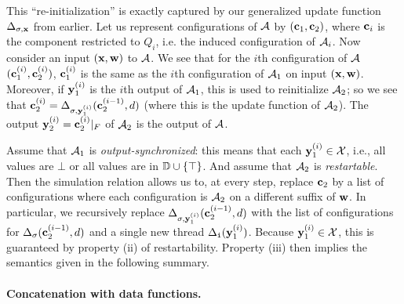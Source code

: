 This ``re-initialization'' is exactly captured by our generalized update function $\Delta_{\sigma, \textbf{x}}$ from earlier. Let us represent configurations of $\mathcal{A}$ by $(\textbf{c}_1, \textbf{c}_2)$, where $\textbf{c}_i$ is the component restricted to $Q_i$, i.e. the induced configuration of $\mathcal{A}_i$.
Now consider an input $(\textbf{x},\textbf{w})$ to $\mathcal{A}$.
We see that for the $i$th configuration of $\mathcal{A}$ $(\textbf{c}_1^{(i)},\textbf{c}_2^{(i)})$, $\textbf{c}_1^{(i)}$ is the same as the $i$th configuration of $\mathcal{A}_1$ on input $(\textbf{x},\textbf{w})$.
Moreover, if $\textbf{y}_1^{(i)}$ is the $i$th output of $\mathcal{A}_1$, this is used to reinitialize $\mathcal{A}_2$;
so we see that $\textbf{c}_2^{(i)} = \Delta_{\sigma,\textbf{y}_1^{(i)}}(\textbf{c}_2^{(i-1)},d)$ (where this is the update function of $\mathcal{A}_2$). The output $\textbf{y}_2^{(i)} = \textbf{c}_2^{(i)}|_F$ of $\mathcal{A}_2$ is the output of $\mathcal{A}$.

Assume that $\mathcal{A}_1$ is \emph{output-synchronized}: this means that each $\textbf{y}_1^{(i)} \in \mathcal{X}$, i.e., all values are $\bot$ or all values are in $\mathbb{D} \cup \{\top\}$. And assume that $\mathcal{A}_2$ is \emph{restartable}. Then the simulation relation allows us to, at every step, replace $\textbf{c}_2$ by a list of configurations where each configuration is $\mathcal{A}_2$ on a different suffix of $\textbf{w}$. In particular, we recursively replace $\Delta_{\sigma, \textbf{y}_1^{(i)}}(\textbf{c}_2^{(i-1)},d)$ with the list of configurations for $\Delta_\sigma(\textbf{c}_2^{(i-1)},d)$ and a single new thread $\Delta_{\texttt{i}}(\textbf{y}_1^{(i)})$. Because $\textbf{y}_1^{(i)} \in \mathcal{X}$, this is guaranteed by property (ii) of restartability. Property (iii) then implies the semantics given in the following summary.

\begin{figure*}[h]

\label{fig:concatenation}
\end{figure*}

\paragraph*{Concatenation with data functions.}

